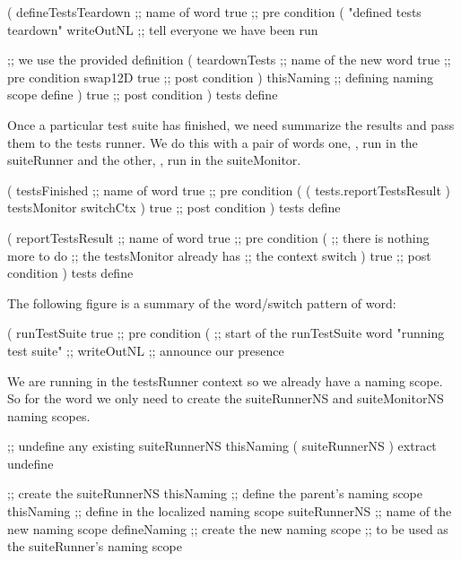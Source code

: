\startJoylolCode
(
  defineTestsTeardown ;; name of word
  { true }            ;; pre condition
  (
    "defined tests teardown"
    writeOutNL        ;; tell everyone we have been run

                      ;; we use the provided definition
    ( 
      teardownTests   ;; name of the new word
      { true }        ;; pre condition
      swap12D
      { true }        ;; post condition
    )
    thisNaming        ;; defining naming scope
    define
  )
  { true }            ;; post condition
)
tests
define
\stopJoylolCode

Once a particular test suite has finished, we need summarize the results 
and pass them to the tests runner. We do this with a pair of words one, 
, run in the suiteRunner and the other, 
, run in the suiteMonitor. 

\startJoylolCode
(
  testsFinished  ;; name of word
  { true }       ;; pre condition
  (
    ( tests.reportTestsResult )
    testsMonitor
    switchCtx
  )
  { true }       ;; post condition
)
tests
define
\stopJoylolCode

\startJoylolCode
(
  reportTestsResult ;; name of word
  { true }          ;; pre condition
  (
                    ;; there is nothing more to do
                    ;; the testsMonitor already has
                    ;; the context switch 
  )
  { true }          ;; post condition
)
tests
define
\stopJoylolCode

\stopTestSuite


The following figure is a summary of the word/switch pattern of 
 word: 


\startJoylolCode
(
  runTestSuite
  { true }                ;; pre condition
  (                       ;; start of the runTestSuite word
    "running test suite"  ;;
    writeOutNL            ;; announce our presence
\stopJoylolCode

We are running in the testsRunner context so we already have a 
 naming scope. So for the  word we 
only need to create the suiteRunnerNS and suiteMonitorNS naming scopes. 

\startJoylolCode
    ;; undefine any existing suiteRunnerNS
    thisNaming
    ( suiteRunnerNS ) extract
    undefine

    ;; create the suiteRunnerNS
    thisNaming    ;; define the parent's naming scope
    thisNaming    ;; define in the localized naming scope
    suiteRunnerNS ;; name of the new naming scope
    defineNaming  ;; create the new naming scope
                  ;; to be used as the suiteRunner's naming scope
\stopJoylolCode

